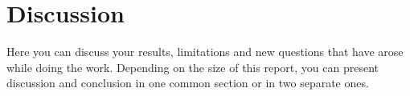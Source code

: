 \section{Discussion}
\label{section:disc}
Here you can discuss your results, limitations and new questions that have arose while doing the work. Depending on the size of this report, you can present discussion and conclusion in one common section or in two separate ones. 